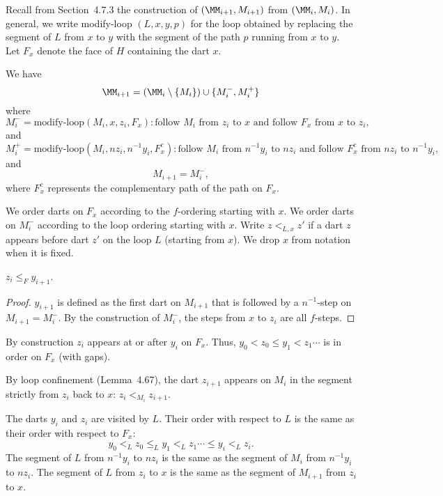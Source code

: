 \begin{lemma}
\begin{lemma}
Recall from Section~4.7.3 the construction of $(\MM_{i+1},M_{i+1})$
from $(\MM_i,M_i)$. 
In general, we write modify-loop $(L,x,y,p)$ for the loop obtained
by replacing the segment of $L$ from $x$ to $y$ with the segment
of the path $p$ running from $x$ to $y$.
Let $F_x$ denote the face of $H$ containing the dart $x$. 

\begin{lemma} 
We have 
\[
\MM_{i+1} = (\MM_i \setminus \{M_i\}) \cup \{M_i^-,M_i^+\}
\]
where 
\[
M_i^- = \text{modify-loop} (M_i,x,z_i,F_x): 
  \text{follow } M_i \text{ from } z_i \text{ to } x
  \text{ and follow } F_x \text{ from } x \text{ to } z_i,
\]
and
\[
M_i^+ = \text{modify-loop} (M_i,nz_i,n^{-1}y_i,F^c_x): 
\text{follow } M_i \text{ from } n^{-1} y_i \text{ to } n z_i
  \text{ and follow } F^c_x \text{ from } nz_i \text{ to } n^{-1} y_i,
\]
and 
\[
M_{i+1} = M_i^-,
\]
where $F^c_x$ represents the complementary path of the path on $F_x$.
\end{lemma} 

We order darts on $F_x$ according to the $f$-ordering starting with $x$.
We order darts on $M_i^-$ 
according to the loop ordering starting with $x$.
Write $z <_{L,x} z'$ if a dart $z$ appears before dart $z'$ on the loop $L$
(starting from $x$).  We drop $x$ from notation when it is fixed.

\begin{lemma}  $z_i \le _F y_{i+1}$.
\end{lemma} 

\begin{proof} $y_{i+1}$ is defined as the first dart on $M_{i+1}$
that is followed by a $n^{-1}$-step on $M_{i+1} = M_i^-$.  By the
construction of $M_i^-$,
the steps from $x$ to $z_i$ are all $f$-steps.
\end{proof}

By construction $z_i$ appears at or after $y_i$ on $F_x$.  Thus,
$y_0 < z_0 \le y_1 < z_1\cdots$ is in order on $F_x$ (with gaps).

By loop confinement (Lemma~4.67), the dart $z_{i+1}$ appears on
$M_i$ in the segment strictly from $z_i$ back to $x$:
$z_i <_{M_i} z_{i+1}$.

\begin{lemma} 
The darts $y_i$ and $z_i$ are visited by $L$.  Their order with
respect to $L$ is the same as their order with respect to $F_x$:
\[
y_0 <_L z_0 \le_L y_1 <_L z_1\cdots \le y_i <_L z_i.
\]
The segment of $L$ from $n^{-1} y_i$ to $n z_i$ is the same
as the segment of $M_i$ from $n^{-1}y_i$ to $n z_i$.
The segment of $L$ from $z_i$ to $x$ is the same as the
segment of $M_{i+1}$ from $z_i$ to $x$.
\end{lemma} 


\end{lemma}
\end{lemma}
